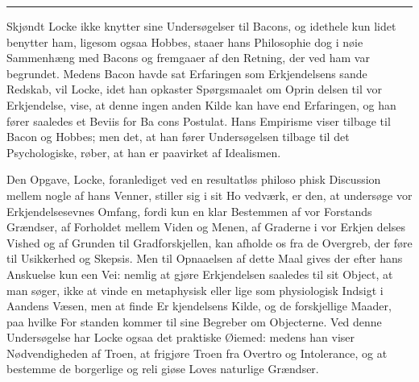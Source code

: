 \documentclass[12pt,a4paper]{book}
\newcommand{\divrule}{\begin{center}\rule{2cm}{0.4pt}\end{center}}
\begin{document}
\divrule

Skjøndt Locke ikke knytter sine Undersøgelser til Bacons,
og idethele kun lidet benytter ham, ligesom ogsaa Hobbes,
staaer hans Philosophie dog i nøie Sammenhæng med Bacons
og fremgaaer af den Retning, der ved ham var begrundet.
Medens Bacon havde sat Erfaringen som Erkjendelsens sande
Redskab, vil Locke, idet han opkaster Spørgsmaalet om Oprin\-%
delsen til vor Erkjendelse, vise, at denne ingen anden Kilde kan
have end Erfaringen, og han fører saaledes et Beviis for Ba\-%
cons Postulat. Hans Empirisme viser tilbage til Bacon og
Hobbes; men det, at han fører Undersøgelsen tilbage til det
Psychologiske, røber, at han er paavirket af Idealismen.

Den Opgave, Locke, foranlediget ved en resultatløs philoso\-%
phisk Discussion mellem nogle af hans Venner, stiller sig i sit Ho\-%
vedværk, er den, at undersøge vor Erkjendelsesevnes Omfang,
fordi kun en klar Bestemmen af vor Forstands Grændser, af
Forholdet mellem Viden og Menen, af Graderne i vor Erkjen\-%
delses Vished og af Grunden til Gradforskjellen, kan afholde
os fra de Overgreb, der føre til Usikkerhed og Skepsis. Men
til Opnaaelsen af dette Maal gives der efter hans Anskuelse
kun een Vei: nemlig at gjøre Erkjendelsen saaledes til sit
Object, at man søger, ikke at vinde en metaphysisk eller lige\-%
som physiologisk Indsigt i Aandens Væsen, men at finde Er\-%
kjendelsens Kilde, og de forskjellige Maader, paa hvilke For\-%
standen kommer til sine Begreber om Objecterne. Ved denne
Undersøgelse har Locke ogsaa det praktiske Øiemed: medens
han viser Nødvendigheden af Troen, at frigjøre Troen fra
Overtro og Intolerance, og at bestemme de borgerlige og reli\-%
giøse Loves naturlige Grændser.
\end{document}
